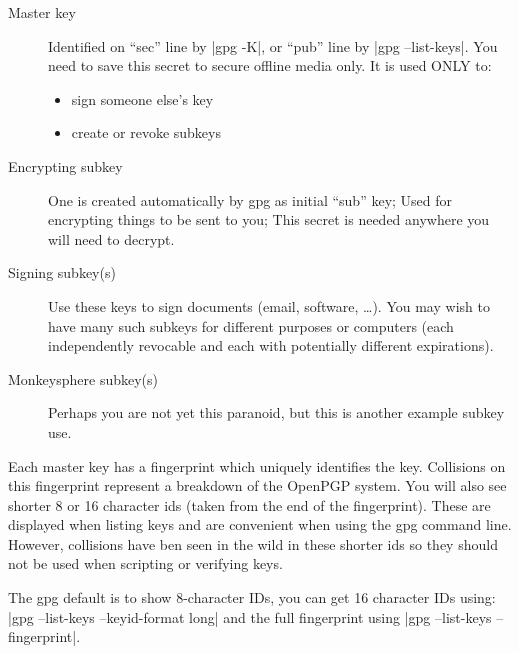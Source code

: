 \documentclass[letterpaper]{article}
\def\tightitems{\setlength{\parskip}{0pt}}
\def\TODO#1{\textsl{[[TODO: #1]]}}
\renewcommand{\_}[1]{\ifmmode_{_{#1}}\else\underline{\phantom{n}}$\,$#1\fi}
\begin{document}
\begin{description}
\item[Master key] Identified on ``sec'' line by |gpg -K|, or ``pub'' line
  by |gpg --list-keys|. You need to save this secret to secure offline
  media only. It is used ONLY to:
  \begin{itemize}\tightitems
  \item sign someone else's key
  \item create or revoke subkeys
  \end{itemize}
\item[Encrypting subkey] One is created automatically by gpg as initial
  ``sub'' key; Used for encrypting things to be sent to you; This secret is
  needed anywhere you will need to decrypt.
\item[Signing subkey(s)] Use these keys to sign documents (email, software,
  \dots). You may wish to have many such subkeys for different purposes or
  computers (each independently revocable and each with potentially
  different expirations).
\item[Monkeysphere subkey(s)] Perhaps you are not yet this paranoid, but
  this is another example subkey use.
\end{description}

Each master key has a fingerprint which uniquely identifies the key.
Collisions on this fingerprint represent a breakdown of the OpenPGP system.
You will also see shorter 8 or 16 character ids (taken from the end of the
fingerprint). These are displayed when listing keys and are convenient when
using the gpg command line. However, collisions have ben seen in the wild
in these shorter ids so they should not be used when scripting or verifying
keys.

The gpg default is to show 8-character IDs, you can get 16 character IDs
using: |gpg --list-keys --keyid-format long| and the full fingerprint using
|gpg --list-keys --fingerprint|.


\end{document}
